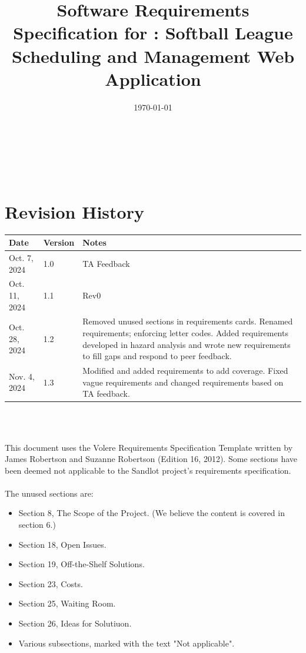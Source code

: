 \documentclass[12pt]{article}
\begin{document}
\title{Software Requirements Specification for \progname: Softball League Scheduling and Management Web Application} 
\author{\authname}
\date{\today}
	
\maketitle

~\newpage


\tableofcontents

~\newpage

\section*{Revision History}

\begin{tabularx}{\textwidth}{p{3cm}p{2cm}X}
\toprule {\textbf{Date}} & {\textbf{Version}} & {\textbf{Notes}}\\
\midrule
Oct. 7, 2024 & 1.0 & TA Feedback\\
Oct. 11, 2024 & 1.1 & Rev0\\
Oct. 28, 2024 & 1.2 & Removed unused sections in requirements cards. Renamed
requirements; enforcing letter codes. Added requirements developed in hazard
analysis and wrote new requirements to fill gaps and respond to peer feedback.
\\
Nov. 4, 2024 & 1.3 & Modified and added requirements to add coverage. Fixed
vague requirements and changed requirements based on TA feedback.\\
\bottomrule
\end{tabularx}

~\\

~\newpage

This document uses the Volere Requirements Specification Template written by
James Robertson and Suzanne Robertson (Edition 16, 2012). Some sections have been deemed not
applicable to the Sandlot project's requirements specification.\\\\
The unused sections are:
\begin{itemize}
  \item Section 8, The Scope of the Project. (We believe the content is covered
  in section 6.)
  \item Section 18, Open Issues.
  \item Section 19, Off-the-Shelf Solutions.
  \item Section 23, Costs.
  \item Section 25, Waiting Room.
  \item Section 26, Ideas for Solutiuon.
  \item Various subsections, marked with the text "Not applicable".
\end{itemize}
\end{document}
